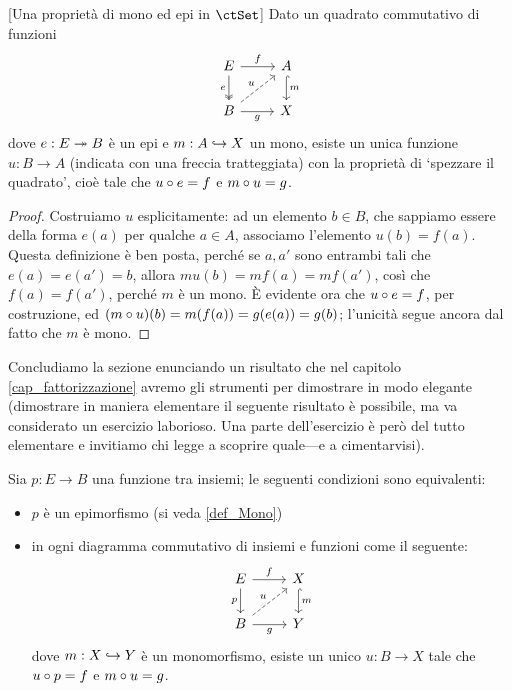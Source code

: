 \begin{proposition}\label{mono_epi_ort}[Una proprietà di mono ed epi in \(\ctSet\)]
	Dato un quadrato commutativo di funzioni
	\[\begin{tikzcd}
			E \ar[r,"f"]\ar[d, two heads, "e"']& A\ar[d, hook, "m"] \\
			B \ar[r, "g"']\ar[ur,dashed,"u"] & X
		\end{tikzcd}\]
	dove \(e : E\twoheadrightarrow B\) è un epi e \(m : A \hookrightarrow X\) un mono, esiste un unica funzione \(u : B\to A\) (indicata con una freccia tratteggiata) con la proprietà di `spezzare il quadrato', cioè tale che \(u\circ e=f\) e \(m\circ u=g\).
\end{proposition}
\begin{proof}
	Costruiamo \(u\) esplicitamente: ad un elemento \(b\in B\), che sappiamo essere della forma \(e(a)\) per qualche \(a\in A\), associamo l'elemento \(u(b)=f(a)\). Questa definizione è ben posta, perché se \(a,a'\) sono entrambi tali che \(e(a)=e(a')=b\), allora \(mu(b)=mf(a)=mf(a')\), così che \(f(a)=f(a')\), perché \(m\) è un mono. \`E evidente ora che \(u\circ e= f\), per costruzione, ed \((m\circ u)(b)=m(f(a))=g(e(a))=g(b)\); l'unicità segue ancora dal fatto che \(m\) è mono.
\end{proof}
Concludiamo la sezione enunciando un risultato che nel capitolo \ref{cap_fattorizzazione} avremo gli strumenti per dimostrare in modo elegante (dimostrare in maniera elementare il seguente risultato è possibile, ma va considerato un esercizio laborioso. Una parte dell'esercizio è però del tutto elementare e invitiamo chi legge a scoprire quale---e a cimentarvisi).
\begin{proposition}\label{caratt_epi_con_ort}
	Sia \(p : E \to B\) una funzione tra insiemi; le seguenti condizioni sono equivalenti:
	\begin{itemize}
		\item \(p\) è un epimorfismo (si veda \ref{def_Mono})
		\item in ogni diagramma commutativo di insiemi e funzioni come il seguente:
		      \[\begin{tikzcd}
				      E \ar[r, "f"]\ar[d, "p"']& X \ar[d,hook, "m"]\\
				      B \ar[r, "g"'] \ar[ur, dashed, "u"]& Y
			      \end{tikzcd}\]
		      dove \(m : X\hookrightarrow Y\) è un monomorfismo, esiste un unico \(u : B\to X\) tale che \(u\circ p = f\) e \(m\circ u = g\).
	\end{itemize}
\end{proposition}
